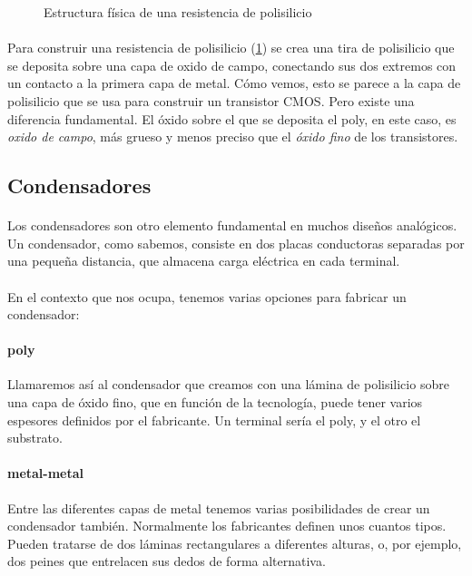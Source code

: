 \begin{figure}[h]
	\centering
	
	\caption{Estructura física de una resistencia de polisilicio}
	\label{fig:poly_res}
\end{figure}

\paragraph{}
Para construir una resistencia de polisilicio (\ref{fig:poly_res}) se crea una tira de polisilicio
que se deposita sobre una capa de oxido de campo, conectando sus dos extremos con
un contacto a la primera capa de metal. Cómo vemos, esto se parece a la capa de
polisilicio que se usa para construir un transistor CMOS. Pero existe una diferencia
fundamental. El óxido sobre el que se deposita el poly, en este caso, es \textit{oxido de
campo}, más grueso y menos preciso que el \textit{óxido fino} de los transistores.

\subsection{Condensadores}\label{cap:condensadores}
\paragraph{}
Los condensadores son otro elemento fundamental en muchos diseños analógicos. Un
condensador, como sabemos, consiste en dos placas conductoras separadas por una pequeña
distancia, que almacena carga eléctrica en cada terminal.

\paragraph{}
En el contexto que nos ocupa, tenemos varias opciones para fabricar un condensador:

\paragraph{poly}
Llamaremos así al condensador que creamos con una lámina de polisilicio sobre una
capa de óxido fino, que en función de la tecnología, puede tener varios espesores
definidos por el fabricante. Un terminal sería el poly, y el otro el substrato.

\paragraph{metal-metal}
Entre las diferentes capas de metal tenemos varias posibilidades de crear un condensador
también. Normalmente los fabricantes definen unos cuantos tipos. Pueden tratarse de
dos láminas rectangulares a diferentes alturas, o, por ejemplo, dos peines que
entrelacen sus dedos de forma alternativa.

